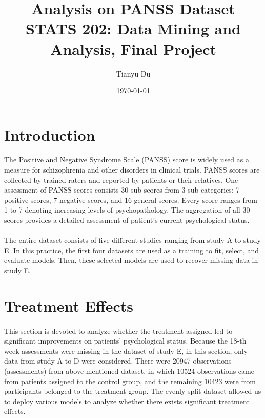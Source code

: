 \documentclass[11pt]{article}
\title{Analysis on PANSS Dataset\\ \small STATS 202: Data Mining and Analysis, Final Project}
\author{Tianyu Du}
\date{\today}
\begin{document}
	\maketitle
	\tableofcontents

	\section{Introduction}
	\paragraph{}The Positive and Negative Syndrome Scale (PANSS) score is widely used as a measure for schizophrenia and other disorders in clinical trials. PANSS scores are collected by trained raters and reported by patients or their relatives. One assessment of PANSS scores consists 30 sub-scores from 3 sub-categories: 7 positive scores, 7 negative scores, and 16 general scores. Every score ranges from 1 to 7 denoting increasing levels of psychopathology. The aggregation of all 30 scores provides a detailed assessment of patient's current psychological status.
	
	\paragraph{}The entire dataset consists of five different studies ranging from study A to study E. In this practice, the first four datasets are used as a training to fit, select, and evaluate models. Then, these selected models are used to recover missing data in study E.
	
	\section{Treatment Effects}
	\paragraph{}This section is devoted to analyze whether the treatment assigned led to significant improvements on patients' psychological status. Because the 18-th week assessments were missing in the dataset of study E, in this section, only data from study A to D were considered. There were 20947 observations (assessments) from above-mentioned dataset, in which 10524 observations came from patients assigned to the control group, and the remaining 10423 were from participants belonged to the treatment group. The evenly-split dataset allowed us to deploy various models to analyze whether there exists significant treatment effects.
	
\end{document}
